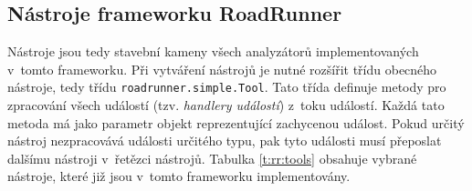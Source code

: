
\subsection{Nástroje frameworku RoadRunner}
Nástroje jsou tedy stavební kameny všech analyzátorů implementovaných v~tomto frameworku. Při vytváření nástrojů je nutné rozšířit třídu obecného nástroje, tedy třídu \texttt{roadrunner.simple.Tool}. Tato třída definuje metody pro zpracování všech událostí (tzv. \textit{handlery událostí}) z~toku událostí. Každá tato metoda má jako parametr objekt reprezentující zachycenou událost. Pokud určitý nástroj nezpracovává události určitého typu, pak tyto události musí přeposlat dalšímu nástroji v~řetězci nástrojů.
Tabulka \ref{t:rr:tools} obsahuje vybrané nástroje, které již jsou v~tomto frameworku implementovány.

